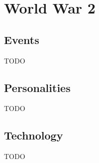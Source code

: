 \documentclass[../my_knowledge.tex]{subfiles}
\begin{document}
\section{World War 2}

\subsection{Events}
TODO

\subsection{Personalities}
TODO

\subsection{Technology}
TODO
\end{document}
